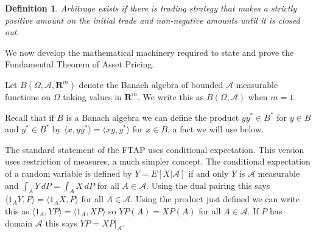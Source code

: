 \documentclass[fleqn]{amsart}
\newcommand{\R}{\mathbf{R}}
\renewcommand{\AA}{\mathcal{A}}
\providecommand{\pair}[1]{\langle#1\rangle}
\newtheorem{definition}{Definition}[section]
\begin{document}


\begin{definition}
{\rm Arbitrage} exists if there is trading strategy
that makes a strictly positive amount on the initial trade
and non-negative amounts until it is closed out.
\end{definition}

We now develop the mathematical machinery required to state and prove
the Fundamental Theorem of Asset Pricing.

Let \(B(\Omega,\AA,\R^m)\) denote the Banach algebra of bounded 
\(\AA\) measurable functions on \(\Omega\) taking values in \(\R^m\). 
We write this as \(B(\Omega,\AA)\) when \(m = 1\).

Recall that if $B$ is a Banach algebra we can define the product 
\(yy^*\in B^*\) for \(y\in B\) and \(y^*\in B^*\) by 
\(\pair{x,yy^*} = \pair{xy,y^*}\) for \(x\in B\),
a fact we will use below. 

The standard statement of the FTAP
uses conditional expectation. This version uses restriction
of measures, a much simpler concept.
The conditional expectation of
a random variable is defined by \(Y = E[X|\AA]\) if and only
\(Y\) is \(\AA\) measurable and
\(\int_A Y\,dP = \int_A X\,dP\) for all \(A\in\AA\).
Using the dual pairing this says \(\pair{1_AY,P} =
\pair{1_AX,P}\) for all \(A\in\AA\).
Using the product just defined we can write this as
\(\pair{1_A,YP} = \pair{1_A,XP}\) so \(YP(A) = XP(A)\)
for all \(A\in\AA\). If \(P\) has domain \(\AA\) this
says \(YP = XP|_\AA\).
\end{document}
